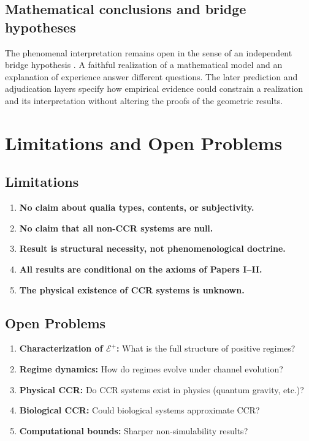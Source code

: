 \documentclass[11pt,a4paper]{article}
\theoremstyle{plain}
\theoremstyle{definition}
\theoremstyle{remark}
\newcommand{\Eplus}{\mathcal{E}^+}
\begin{document}
\subsection{Mathematical conclusions and bridge hypotheses}
The phenomenal interpretation remains open in the sense of an independent
bridge hypothesis \cite{chalmers}. A faithful realization of a mathematical
model and an explanation of experience answer different questions. The
later prediction and adjudication layers specify how empirical evidence
could constrain a realization and its interpretation without altering the
proofs of the geometric results.

\section{Limitations and Open Problems}

\subsection{Limitations}

\begin{enumerate}
\item \textbf{No claim about qualia types, contents, or subjectivity.}
\item \textbf{No claim that all non-CCR systems are null.}
\item \textbf{Result is structural necessity, not phenomenological doctrine.}
\item \textbf{All results are conditional on the axioms of Papers I--II.}
\item \textbf{The physical existence of CCR systems is unknown.}
\end{enumerate}

\subsection{Open Problems}

\begin{enumerate}
\item \textbf{Characterization of $\Eplus$:} What is the full structure of positive regimes?
\item \textbf{Regime dynamics:} How do regimes evolve under channel evolution?
\item \textbf{Physical CCR:} Do CCR systems exist in physics (quantum gravity, etc.)?
\item \textbf{Biological CCR:} Could biological systems approximate CCR?
\item \textbf{Computational bounds:} Sharper non-simulability results?
\end{enumerate}
\end{document}
